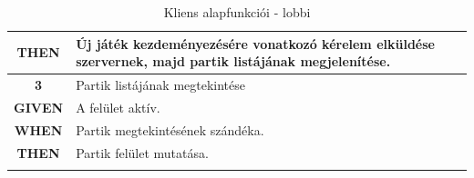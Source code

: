 \documentclass[twoside, a4paper, 12pt]{article}
\begin{document}
\begin{longtable}[c]{|c|p{14cm}|}
\textbf{THEN} &
Új játék kezdeményezésére vonatkozó kérelem elküldése szervernek, majd partik listájának megjelenítése.
\\
\hline

\rowcolor[HTML]{CBCEFB} 
\textbf{3}
&	Partik listájának megtekintése
\\ \nobreakhline

\textbf{GIVEN} &
A felület aktív.
\\ \nobreakhline

\textbf{WHEN} &
Partik megtekintésének szándéka.
\\
\nobreakhline

\textbf{THEN} &
Partik felület mutatása.
\\
\hline
\caption{Kliens alapfunkciói - lobbi}
\label{userStories:client:lobby}\\
\end{longtable}
\end{document}
